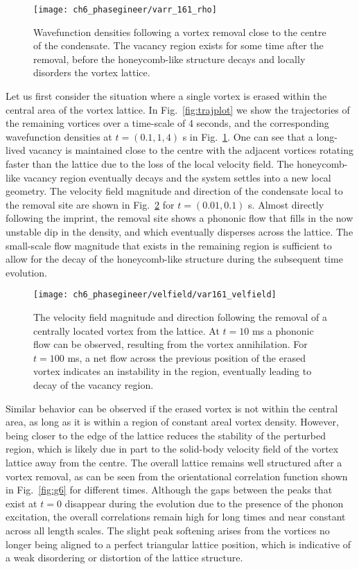 \begin{figure}\centering
\texttt{[image: ch6\_phasegineer/varr\_161\_rho]}
    \caption{ Wavefunction densities following a vortex removal close to the centre of the condensate. The vacancy region exists for some time after the removal, before the honeycomb-like structure decays and locally disorders the vortex lattice. }
    \label{fig:varr161_rho}
\end{figure}
Let us first consider the situation where a single vortex is erased within the central area of the vortex lattice. In Fig.~\ref{fig:trajplot} we show the trajectories of the remaining vortices over a time-scale of 4 seconds, and the corresponding wavefunction densities at $t=(0.1,1,4)$ s in Fig.~\ref{fig:varr161_rho}. One can see that a long-lived vacancy is maintained close to the centre with the adjacent vortices rotating faster than the lattice due to the loss of the local velocity field. The honeycomb-like vacancy region eventually decays and the system settles into a new local geometry. The velocity field magnitude and direction of the condensate local to the removal site are shown in Fig.~\ref{fig:varr161_velfield} for $t=(0.01,0.1)$ s. Almost directly following the imprint, the removal site shows a phononic flow that fills in the now unstable dip in the density, and which eventually disperses across the lattice. The small-scale flow magnitude that exists in the remaining region is sufficient to allow for the decay of the honeycomb-like structure during the subsequent time evolution.

\begin{figure}\centering
    \texttt{[image: ch6\_phasegineer/velfield/var161\_velfield]}
    \caption{The velocity field magnitude and direction following the removal of a centrally located vortex from the lattice. At $t=10$ ms a phononic flow can be observed, resulting from the vortex annihilation. For $t=100$ ms, a net flow across the previous position of the erased vortex indicates an instability in the region, eventually leading to decay of the vacancy region. }\label{fig:varr161_velfield}
\end{figure}

Similar behavior can be observed if the erased vortex is not within the central area, as long as it is within a region of constant areal vortex density. However, being closer to the edge of the lattice reduces the stability of the perturbed region, which is likely due in part to the solid-body velocity field of the vortex lattice away from the centre. The overall lattice remains well structured after a vortex removal, as can be seen from the orientational correlation function shown in Fig.~\ref{fig:g6} for different times. Although the gaps between the peaks that exist at $t=0$ disappear during the evolution due to the presence of the phonon excitation, the overall correlations remain high for long times and near constant across all length scales. The slight peak softening arises from the vortices no longer being aligned to a perfect triangular lattice position, which is indicative of a weak disordering or distortion of the lattice structure.

